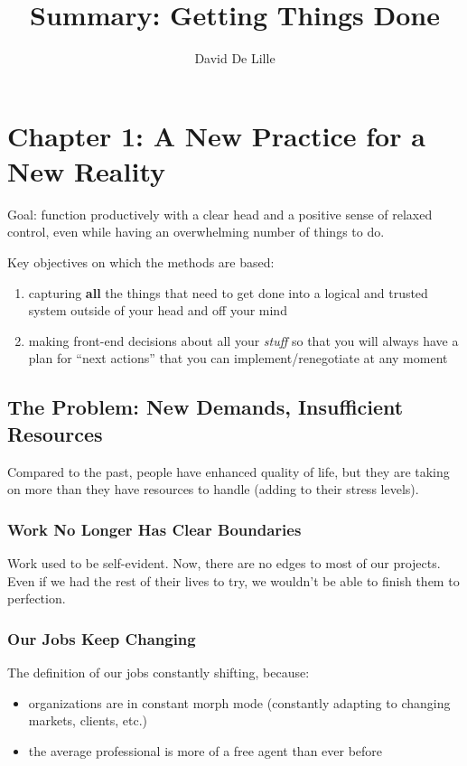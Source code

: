 \documentclass[letterpaper]{article}
\author{David De Lille}
\title{Summary: Getting Things Done}
\newcommand{\p}{\vspace{1em}\par}		%
\begin{document}
\maketitle

\section{Chapter 1: A New Practice for a New Reality}
Goal: function productively with a clear head and a positive sense of relaxed control, even while having an overwhelming number of things to do.

\p Key objectives on which the methods are based:
\begin{enumerate}
\item capturing \textbf{all} the things that need to get done into a logical and trusted system outside of your head and off your mind
\item making front-end decisions about all your \textit{stuff} so that you will always have a plan for ``next actions'' that you can implement/renegotiate at any moment
\end{enumerate}

\subsection{The Problem: New Demands, Insufficient Resources}
Compared to the past, people have enhanced quality of life, but they are taking on more than they have resources to handle (adding to their stress levels).

\subsubsection*{Work No Longer Has Clear Boundaries}
Work used to be self-evident. Now, there are no edges to most of our projects. Even if we had the rest of their lives to try, we wouldn't be able to finish them to perfection. 

\subsubsection*{Our Jobs Keep Changing}
The definition of our jobs constantly shifting, because:
\begin{itemize}
\item organizations are in constant morph mode (constantly adapting to changing markets, clients, etc.)
\item the average professional is more of a free agent than ever before
\end{itemize}
\end{document}
